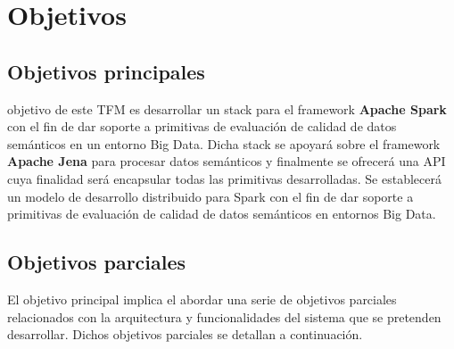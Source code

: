 \chapter{Objetivos}
\label{chap:objetivos}
\section{Objetivos principales}

 objetivo de este \acf{TFM} es desarrollar un stack para el framework \textbf{Apache Spark} con el fin de dar soporte a primitivas de evaluación de calidad de datos semánticos en un entorno Big Data. Dicha stack se apoyará
  sobre el framework \textbf{Apache Jena} para procesar datos semánticos y
  finalmente se ofrecerá una \acs{API} cuya finalidad será encapsular todas
las primitivas desarrolladas. Se establecerá un modelo de
  desarrollo distribuido para Spark con el fin de dar soporte
  a primitivas de evaluación de calidad de datos semánticos en entornos Big Data.


\section{Objetivos parciales}

El objetivo principal implica el abordar una serie de objetivos parciales
relacionados con la arquitectura y funcionalidades del sistema que se pretenden
desarrollar. Dichos objetivos parciales se detallan a continuación. 



